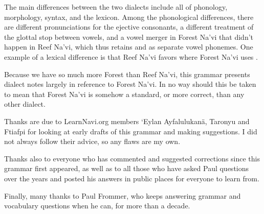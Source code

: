 The main differences between the two dialects include all of
phonology, morphology, syntax, and the lexicon.  Among the
phono\-logical differences, there are different pronunciations for the
ejective consonants, a different treatment of the glottal stop between
vowels, and a vowel merger in Forest Na'vi that didn't happen in Reef
Na'vi, which thus retains  and  as separate vowel phonemes.
One example of a lexical difference is that Reef Na'vi
favors   where Forest Na'vi uses .

Because we have so much more Forest than Reef Na'vi, this grammar
presents dialect notes largely in reference to Forest Na'vi.  In no
way should this be taken to mean that Forest Na'vi is somehow a
standard, or more correct, than any other dialect.



\vfill
Thanks are due to LearnNavi.org members `Eylan Ayfalulukanä, Taronyu
and Ftiafpi for looking at early drafts of this grammar and making
suggestions.  I did not always follow their advice, so any flaws are
my own.

Thanks also to everyone who has commented and suggested corrections
since this grammar first appeared, as well as to all those who have
asked Paul questions over the years and posted his answers in public
places for everyone to learn from.

Finally, many thanks to Paul Frommer, who keeps answering grammar
and vocabulary ques\-tions when he can, for more than a decade.



\bigskip

